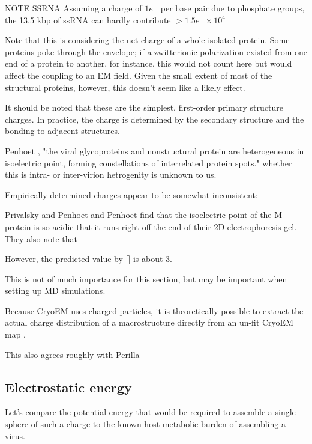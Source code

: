 \documentclass[paper.tex]{subfiles}
\begin{document}
NOTE SSRNA Assuming a charge of $1e^-$ per base pair due to phosphate groups, the 13.5 kbp of ssRNA can hardly contribute $> 1.5e^- \times10^4$



Note that this is considering the net charge of a whole isolated protein. Some proteins poke through the envelope; if a zwitterionic polarization existed from one end of a protein to another, for instance, this would not count here but would affect the coupling to an EM field. Given the small extent of most of the structural proteins, however, this doesn't seem like a likely effect.

\begin{sidenote}
	It should be noted that these are the simplest, first-order primary structure charges. In practice, the charge is determined by the secondary structure and the bonding to adjacent structures.
	
	
	
	 Penhoet \cite{Structurea}, "the viral glycoproteins and nonstructural protein are heterogeneous in isoelectric point, forming constellations of interrelated protein spots." whether this is intra- or inter-virion hetrogenity is unknown to us. 
	
	Empirically-determined charges appear to be somewhat inconsistent:
	
	Privalsky and Penhoet \cite{Influenza1978} and Penhoet \cite{Structurea} find that the isoelectric point of the M protein is so acidic that it runs right off the end of their 2D electrophoresis gel. They also note that 
	
	However, the predicted value by [] is about 3.
	
	This is not of much importance for this section, but may be important when setting up MD simulations.
	
	Because CryoEM uses charged particles, it is theoretically possible to extract the actual charge distribution of a macrostructure directly from an un-fit CryoEM map \cite{Identification2018}. 
\end{sidenote}

This also agrees roughly with Perilla \cite{Physical2017}


\subsection{Electrostatic energy}

Let's compare the potential energy that would be required to assemble a single sphere of such a charge to the known host metabolic burden of assembling a virus.
\end{document}
